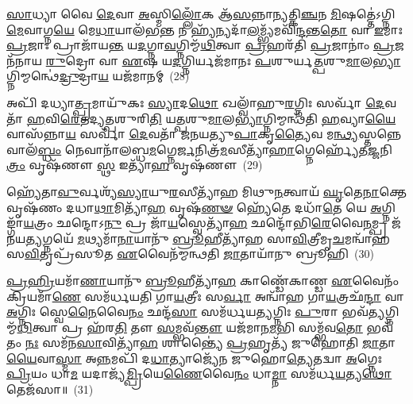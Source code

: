 {}%

\-\ul{𑌸𑌾}\-𑌧𑍍𑌯𑌾 𑌵𑍈 \ul{𑌦𑍇}\-𑌵𑌾 \ul{𑌅}\-𑌸𑍍𑌮𑌿\-\ul{𑌲𑍍𑌲𑍋𑌁}\-𑌕 𑌆᳴\-\ul{𑌸}\-𑌨𑍍𑌨𑌾𑌨𑍍𑌯𑌤𑍍𑌕𑌿\-\ul{𑌞𑍍𑌚}\-𑌨 \ul{𑌮𑌿}\-𑌷𑌤𑍍𑌤𑍇॑\-𑌽𑌗𑍍𑌨𑌿\-\ul{𑌮𑍇}\-𑌵𑌾𑌗𑍍𑌨\-\ul{𑌯𑍇} 𑌮𑍇\-\ul{𑌧𑌾}\-𑌯𑌾𑌲᳴𑌭\-\ul{𑌨𑍍𑌤} 𑌨 𑌹𑍍𑌯᳴𑌨𑍍𑌯𑌦𑌾᳴\-\ul{𑌲}\-𑌮𑍍𑌭𑍍𑌯᳴𑌮𑌵𑌿᳴\-\ul{𑌨𑍍𑌦}\-𑌨𑍍𑌤\-\ul{𑌤𑍋} 𑌵𑌾 \ul{𑌇}\-𑌮𑌾𑌃 \ul{𑌪𑍍𑌰}\-𑌜𑌾𑌃 𑌪𑍍𑌰𑌾𑌜𑌾᳴𑌯\-\ul{𑌨𑍍𑌤} 𑌯\-\ul{𑌦}\-𑌗𑍍𑌨𑌾\-\ul{𑌵}\-𑌗𑍍𑌨𑌿𑌮𑍍𑌮᳴\-\ul{𑌥𑌿}\-𑌤𑍍𑌵𑌾 \ul{𑌪𑍍𑌰}\-𑌹𑌰᳴𑌤𑌿 \ul{𑌪𑍍𑌰}\-𑌜𑌾𑌨𑌾𑌂॑ \ul{𑌪𑍍𑌰}\-𑌜𑌨᳴𑌨𑌾𑌯 \ul{𑌰𑍁}\-𑌦𑍍𑌰𑍋 𑌵𑌾 \ul{𑌏}\-𑌷 𑌯\-\ul{𑌦}\-𑌗𑍍𑌨𑌿𑌰𑍍𑌯𑌜᳴𑌮𑌾𑌨𑌃 \ul{𑌪}\-𑌶𑍁𑌰𑍍𑌯\-\ul{𑌤𑍍𑌪}\-𑌶𑍁\-\ul{𑌮𑌾}\-𑌲\-\ul{𑌭𑍍𑌯𑌾}\-𑌗𑍍𑌨𑌿𑌮𑍍𑌮𑌨𑍍𑌥𑍇॑\-\ul{𑌦𑍍𑌰𑍁}\-𑌦𑍍𑌰𑌾\-\ul{𑌯} 𑌯𑌜᳴𑌮𑌾𑌨𑌮𑍍~(28)

𑌅𑌪𑌿᳴ 𑌦𑌧𑍍𑌯𑌾\-\ul{𑌤𑍍𑌪𑍍𑌰}\-𑌮𑌾𑌯𑍁᳴𑌕𑌃 \ul{𑌸𑍍𑌯𑌾}\-𑌦\-\ul{𑌥𑍋} 𑌖𑌲𑍍𑌵𑌾᳴𑌹𑍁\-\ul{𑌰}\-𑌗𑍍𑌨𑌿𑌃 𑌸𑌰𑍍𑌵𑌾᳴ \ul{𑌦𑍇}\-𑌵𑌤𑌾᳴ \ul{𑌹}\-𑌵𑌿\-\ul{𑌰𑍇}\-𑌤𑌦𑍍𑌯\-\ul{𑌤𑍍𑌪}\-𑌶𑍁𑌰𑌿\-\ul{𑌤𑌿} 𑌯\-\ul{𑌤𑍍𑌪}\-𑌶𑍁\-\ul{𑌮𑌾}\-𑌲\-\ul{𑌭𑍍𑌯𑌾}\-𑌗𑍍𑌨𑌿𑌮𑍍𑌮𑌨𑍍𑌥᳴𑌤𑌿 \ul{𑌹}\-𑌵𑍍𑌯𑌾\-\ul{𑌯𑍈}\-𑌵𑌾𑌸᳴𑌨𑍍𑌨𑌾\-\ul{𑌯} 𑌸𑌰𑍍𑌵𑌾᳴ \ul{𑌦𑍇}\-𑌵𑌤𑌾᳴ 𑌜𑌨𑌯𑌤𑍍𑌯𑍁\-\ul{𑌪𑌾}\-𑌕𑍃\-\ul{𑌤𑍍𑌯𑍈}\-𑌵 𑌮\-\ul{𑌨𑍍𑌥𑍍𑌯}\-𑌸𑍍𑌤𑌨𑍍𑌨𑍇𑌵𑌾𑌲᳴\-\ul{𑌬𑍍𑌧𑌂} 𑌨𑍇𑌵𑌾𑌨𑌾᳴𑌲𑌬𑍍𑌧\-\ul{𑌮}\-𑌗𑍍𑌨𑍇\-\ul{𑌰𑍍𑌜}\-𑌨𑌿𑌤𑍍𑌰᳴\-\ul{𑌮}\-𑌸𑍀𑌤𑍍𑌯𑌾᳴\-\ul{𑌹𑌾}\-𑌗𑍍𑌨𑍇𑌰𑍍\mbox{}𑌹𑍍𑌯𑍇᳴𑌤\-\ul{𑌜𑍍𑌜}\-𑌨𑌿\-\ul{𑌤𑍍𑌰𑌂} 𑌵𑍃𑌷᳴𑌣𑍗 \ul{𑌸𑍍𑌥} 𑌇𑌤𑍍𑌯𑌾᳴\-\ul{𑌹} 𑌵𑍃𑌷᳴𑌣𑍗~(29)

𑌹𑍍𑌯𑍇᳴𑌤𑌾\-\ul{𑌵𑍁}\-𑌰𑍍𑌵𑌶𑍍𑌯᳴\-\ul{𑌸𑍍𑌯𑌾}\-𑌯𑍁\-\ul{𑌰}\-𑌸𑍀𑌤𑍍𑌯𑌾᳴𑌹 𑌮𑌿𑌥𑍁\-\ul{𑌨}\-𑌤𑍍𑌵𑌾𑌯᳴ \ul{𑌘𑍃}\-𑌤𑍇\-\ul{𑌨𑌾}\-𑌕𑍍𑌤𑍇 𑌵𑍃𑌷᳴𑌣𑌂 𑌦𑌧𑌾\-\ul{𑌥𑌾}\-𑌮𑌿𑌤𑍍𑌯𑌾᳴\-\ul{𑌹} 𑌵𑍃𑌷᳴\-\ul{𑌣}\-\-\ul{𑍟} 𑌹𑍍𑌯𑍇᳴𑌤𑍇 𑌦𑌧𑌾᳴\-\ul{𑌤𑍇} 𑌯𑍇 \ul{𑌅}\-𑌗𑍍𑌨𑌿𑌙𑍍𑌗𑌾᳴\-\ul{𑌯}\-𑌤𑍍𑌰𑌂 𑌛𑌨𑍍𑌦𑍋\-𑌽\-\ul{𑌨𑍁} 𑌪𑍍𑌰 𑌜𑌾᳴\-\ul{𑌯}\-𑌸𑍍𑌵𑍇𑌤𑍍𑌯𑌾᳴\-\ul{𑌹} 𑌛𑌨𑍍𑌦𑍋᳴𑌭𑌿\-\ul{𑌰𑍇}\-𑌵𑍈\-\ul{𑌨}\-𑌮𑍍𑌪𑍍𑌰 𑌜᳴𑌨𑌯\-\ul{𑌤𑍍𑌯}\-𑌗𑍍𑌨𑌯𑍇᳴ \ul{𑌮}\-𑌥𑍍𑌯𑌮𑌾᳴\-\ul{𑌨𑌾}\-𑌯𑌾𑌨𑍁᳴ \ul{𑌬𑍍𑌰𑍂}\-𑌹𑍀𑌤𑍍𑌯𑌾᳴𑌹 𑌸𑌾\-\ul{𑌵𑌿}\-𑌤𑍍𑌰𑍀𑌮𑍃\-\ul{𑌚}\-𑌮𑌨𑍍𑌵𑌾᳴𑌹 𑌸\-\ul{𑌵𑌿}\-𑌤𑍃𑌪𑍍𑌰᳴𑌸𑍂𑌤 \ul{𑌏}\-𑌵𑍈𑌨᳴𑌮𑍍𑌮𑌨𑍍𑌥𑌤𑌿 \ul{𑌜𑌾}\-𑌤𑌾𑌯𑌾᳴𑌨𑍁 𑌬𑍍𑌰𑍂𑌹𑌿~(30)

\-\ul{𑌪𑍍𑌰}\-\-\ul{𑌹𑍍𑌰𑌿}\-𑌯𑌮𑌾᳴\-\ul{𑌣𑌾}\-𑌯𑌾𑌨𑍁᳴ \ul{𑌬𑍍𑌰𑍂}\-𑌹𑍀𑌤𑍍𑌯𑌾᳴\-\ul{𑌹} 𑌕𑌾𑌣𑍍𑌡𑍇᳴𑌕𑌾𑌣𑍍𑌡 \ul{𑌏}\-𑌵𑍈𑌨𑌂᳴ 𑌕𑍍𑌰𑌿𑌯𑌮𑌾᳴\-\ul{𑌣𑍇} 𑌸𑌮᳴𑌰𑍍𑌧𑌯𑌤𑌿 𑌗𑌾\-\ul{𑌯}\-𑌤𑍍𑌰𑍀𑌃 𑌸\-\ul{𑌰𑍍𑌵𑌾} 𑌅𑌨𑍍𑌵𑌾᳴𑌹 𑌗𑌾\-\ul{𑌯}\-𑌤𑍍𑌰𑌛᳴\-\ul{𑌨𑍍𑌦𑌾} 𑌵𑌾 \ul{𑌅}\-𑌗𑍍𑌨𑌿𑌃 𑌸𑍍𑌵𑍇\-\ul{𑌨𑍈}\-𑌵𑍈\-\ul{𑌨𑌂} 𑌛𑌨𑍍𑌦᳴\-\ul{𑌸𑌾} 𑌸𑌮᳴𑌰𑍍𑌧𑌯\-\ul{𑌤𑍍𑌯}\-𑌗𑍍𑌨𑌿𑌃 \ul{𑌪𑍁}\-𑌰𑌾 𑌭𑌵᳴\-\ul{𑌤𑍍𑌯}\-𑌗𑍍𑌨𑌿𑌮𑍍𑌮᳴\-\ul{𑌥𑌿}\-𑌤𑍍𑌵𑌾 𑌪𑍍𑌰 𑌹᳴𑌰\-\ul{𑌤𑌿} 𑌤𑍗 \ul{𑌸}\-𑌮𑍍𑌭𑌵᳴\-\ul{𑌨𑍍𑌤𑍗} 𑌯𑌜᳴𑌮𑌾𑌨\-\ul{𑌮}\-𑌭𑌿 𑌸𑌮𑍍𑌭᳴𑌵\-\ul{𑌤𑍋} 𑌭𑌵᳴𑌤𑌂 \ul{𑌨𑌃} 𑌸𑌮᳴𑌨\-\ul{𑌸𑌾}\-𑌵𑌿𑌤𑍍𑌯𑌾᳴\-\ul{𑌹} 𑌶𑌾𑌨𑍍𑌤𑍍𑌯𑍈॑ \ul{𑌪𑍍𑌰}\-𑌹𑍃𑌤𑍍𑌯᳴ 𑌜𑍁𑌹𑍋𑌤𑌿 \ul{𑌜𑌾}\-𑌤𑌾\-\ul{𑌯𑍈}\-𑌵𑌾\-\ul{𑌸𑍍𑌮𑌾} 𑌅\-\ul{𑌨𑍍𑌨}\-𑌮𑌪𑌿᳴ 𑌦\-\ul{𑌧𑌾}\-𑌤𑍍𑌯𑌾𑌜𑍍𑌯𑍇᳴𑌨 𑌜𑍁𑌹𑍋\-\ul{𑌤𑍍𑌯𑍇}\-𑌤𑌦𑍍𑌵𑌾 \ul{𑌅}\-𑌗𑍍𑌨𑍇𑌃 \ul{𑌪𑍍𑌰𑌿}\-𑌯𑌂 𑌧𑌾\-\ul{𑌮} 𑌯𑌦𑌾𑌜𑍍𑌯᳴\-\ul{𑌮𑍍𑌪𑍍𑌰𑌿}\-𑌯𑍇\-\ul{𑌣𑍈}\-𑌵𑍈\-\ul{𑌨𑌂} 𑌧𑌾\-\ul{𑌮𑍍𑌨𑌾} 𑌸𑌮᳴𑌰𑍍𑌧\-\ul{𑌯}\-𑌤𑍍𑌯\-\ul{𑌥𑍋} 𑌤𑍇𑌜᳴𑌸𑌾॥~(31)

